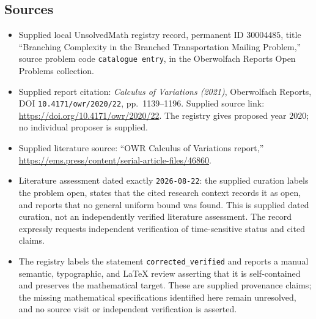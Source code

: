 \documentclass[11pt]{article}
\begin{document}
\subsection{Sources}
\begin{itemize}
\item Supplied local UnsolvedMath registry record, permanent ID \(30004485\), title ``Branching Complexity in the Branched Transportation Mailing Problem,'' source problem code \texttt{catalogue entry}, in the Oberwolfach Reports Open Problems collection.
\item Supplied report citation: \emph{Calculus of Variations (2021)}, Oberwolfach Reports, DOI \texttt{10.4171/owr/2020/22}, pp.\ 1139--1196. Supplied source link: \url{https://doi.org/10.4171/owr/2020/22}. The registry gives proposed year \(2020\); no individual proposer is supplied.
\item Supplied literature source: ``OWR Calculus of Variations report,'' \url{https://ems.press/content/serial-article-files/46860}.
\item Literature assessment dated exactly \texttt{2026-08-22}: the supplied curation labels the problem open, states that the cited research context records it as open, and reports that no general uniform bound was found. This is supplied dated curation, not an independently verified literature assessment. The record expressly requests independent verification of time-sensitive status and cited claims.
\item The registry labels the statement \texttt{corrected\_verified} and reports a manual semantic, typographic, and LaTeX review asserting that it is self-contained and preserves the mathematical target. These are supplied provenance claims; the missing mathematical specifications identified here remain unresolved, and no source visit or independent verification is asserted.
\end{itemize}
\end{document}

